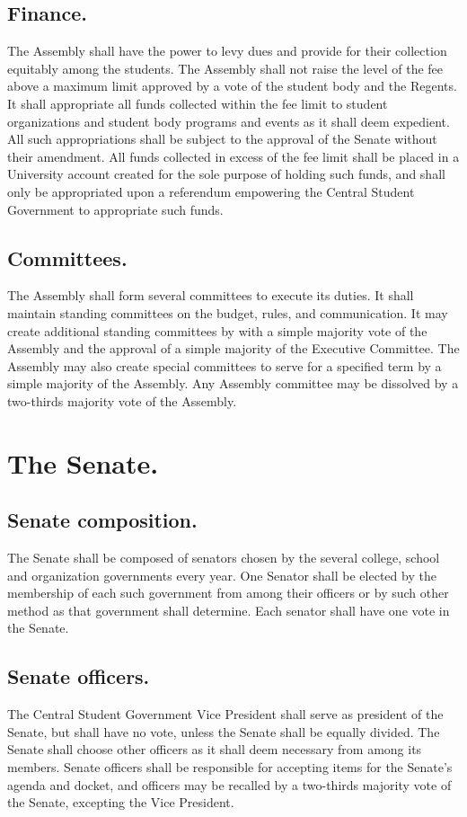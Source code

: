 \subsection{Finance.}

     The Assembly shall have the power to levy dues and provide for their collection equitably among the students. The Assembly shall not raise the level of the fee above a maximum limit approved by a vote of the student body and the Regents. It shall appropriate all funds collected within the fee limit to student organizations and student body programs and events as it shall deem expedient. All such appropriations shall be subject to the approval of the Senate without their amendment. All funds collected in excess of the fee limit shall be placed in a University account created for the sole purpose of holding such funds, and shall only be appropriated upon a referendum empowering the Central Student Government to appropriate such funds.

\subsection{Committees.}

    The Assembly shall form several committees to execute its duties. It shall maintain standing committees on the budget, rules, and communication. It may create additional standing committees by with a simple majority vote of the Assembly and the approval of a simple majority of the Executive Committee. The Assembly may also create special committees to serve for a specified term by a simple majority of the Assembly. Any Assembly committee may be dissolved by a two-thirds majority vote of the Assembly.

\section{The Senate.}

\subsection{Senate composition.}
    The Senate shall be composed of senators chosen by the several college, school and organization governments every year. One Senator shall be elected by the membership of each such government from among their officers or by such other method as that government shall determine. Each senator shall have one vote in the Senate.

\subsection{Senate officers.}
    The Central Student Government Vice President shall serve as president of the Senate, but shall have no vote, unless the Senate shall be equally divided. The Senate shall choose other officers as it shall deem necessary from among its members. Senate officers shall be responsible for accepting items for the Senate's agenda and docket, and officers may be recalled by a two-thirds majority vote of the Senate, excepting the Vice President.

